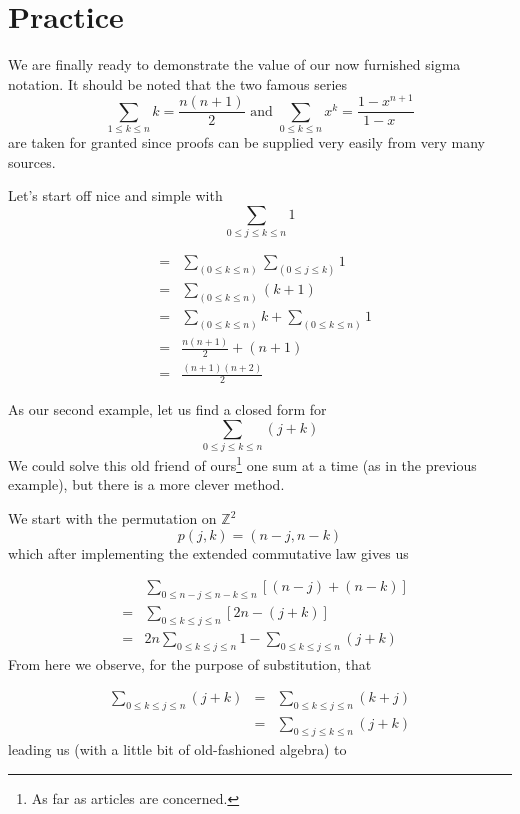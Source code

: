 \documentclass[twoside]{article}
\begin{document}
\section{Practice}

We are finally ready to demonstrate the value of our now
furnished sigma notation.  It should be noted that the two
famous series
$$  \sum_{1\le k\le n}\!\!\! k=\frac{n(n+1)}{2}\mbox{\ \ \ and\ \ }  
\sum_{0\le k\le n}\!\!\! x^k=\frac{1-x^{n+1}}{1-x^{}\ \ \ \ }  $$
are taken for granted since proofs can be supplied very
easily from very many sources.

Let's start off nice and simple with
$$  \sum_{0\le j\le k\le n}\!\!\!\!\! 1  $$ 

\begin{eqnarray*}
 & = & \sum_{(0\le k\le n)}\sum_{(0\le j\le k)}\!\!\! 1              \\
 & = & \sum_{(0\le k\le n)}\!\!\!\! (k+1)                            \\
 & = & \sum_{(0\le k\le n)}\!\!\!\! k+\sum_{(0\le k\le n)}\!\!\!\! 1 \\
 & = & \frac{n(n+1)}{2}+(n+1)                      \\
 & = & \frac{(n+1)(n+2)}{2} 
\end{eqnarray*}

As our second example, let us find a closed form for
$$  \sum_{0\le j\le k\le n}\!\!\!\!\! (j+k)  $$
We could solve this old friend of ours\footnote{As far as 
articles are concerned.} one sum at a time (as in the 
previous example), but there is a more clever method.    

We start with the permutation on $  \mathbb{Z}^2  $
$$  p(j,k)=(n-j,n-k)  $$ which after implementing the 
extended commutative law gives us

\begin{eqnarray*}
 &   & \sum_{0\le n-j\le n-k\le n}\!\!\!\!\!\!\!\!\!\!\! [(n-j)+(n-k)]  \\
 & = & \sum_{0\le k\le j\le n}\!\!\!\!\! [2n-(j+k)]                     \\
 & = & 2n\!\!\!\!\!\!\sum_{0\le k\le j\le n}\!\!\!\!\!\! 1
-\sum_{0\le k\le j\le n}\!\!\!\!\! (j+k) 
\end{eqnarray*} From here we observe, for the purpose of 
substitution, that

\begin{eqnarray*}
\sum_{0\le k\le j\le n}\!\!\!\!\! (j+k) 
 & = & \sum_{0\le k\le j\le n}\!\!\!\!\! (k+j) \\
 & = & \sum_{0\le j\le k\le n}\!\!\!\!\! (j+k)
\end{eqnarray*} leading us (with a little bit of old-fashioned
 algebra) to
\end{document}

